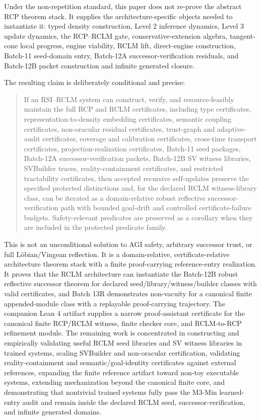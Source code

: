 \documentclass[11pt,a4paper]{article}
\begin{document}
Under the non-repetition standard, this paper does not re-prove the abstract RCP theorem stack.  It supplies the architecture-specific objects needed to instantiate it: typed density construction, Level 2 inference dynamics, Level 3 update dynamics, the RCP--RCLM gate, conservative-extension algebra, tangent-cone local progress, engine viability, RCLM lift, direct-engine construction, Batch-11 seed-domain entry, Batch-12A successor-verification residuals, and Batch-12B packet construction and infinite generated closure.

The resulting claim is deliberately conditional and precise:
\begin{quote}
If an RSI--RCLM system can construct, verify, and resource-feasibly maintain the full RCP and RCLM certificates, including type certificates, representation-to-density embedding certificates, semantic coupling certificates, non-oracular residual certificates, trust-graph and adaptive-audit certificates, coverage and calibration certificates, cross-time transport certificates, projection-realization certificates, Batch-11 seed packages, Batch-12A successor-verification packets, Batch-12B SV witness libraries, SVBuilder traces, reality-containment certificates, and restricted tractability certificates, then accepted recursive self-updates preserve the specified protected distinctions and, for the declared RCLM witness-library class, can be iterated as a domain-relative robust reflective successor-verification path with bounded goal-drift and controlled certificate-failure budgets.  Safety-relevant predicates are preserved as a corollary when they are included in the protected predicate family.
\end{quote}

This is not an unconditional solution to AGI safety, arbitrary successor trust, or full L\"obian/Vingean reflection.  It is a domain-relative, certificate-relative architecture theorem stack with a finite proof-carrying reference-entry realization.  It proves that the RCLM architecture can instantiate the Batch-12B robust reflective successor theorem for declared seed/library/witness/builder classes with valid certificates, and Batch 13R demonstrates non-vacuity for a canonical finite appended-module class with a replayable proof-carrying trajectory.  The companion Lean 4 artifact supplies a narrow proof-assistant certificate for the canonical finite RCP/RCLM witness, finite checker core, and RCLM-to-RCP refinement module.  The remaining work is concentrated in constructing and empirically validating useful RCLM seed libraries and SV witness libraries in trained systems, scaling SVBuilder and non-oracular certification, validating reality-containment and semantic/goal-identity certificates against external references, expanding the finite reference artifact toward non-toy executable systems, extending mechanization beyond the canonical finite core, and demonstrating that nontrivial trained systems fully pass the M3-Min learned-entry audit and remain inside the declared RCLM seed, successor-verification, and infinite generated domains.
\end{document}
